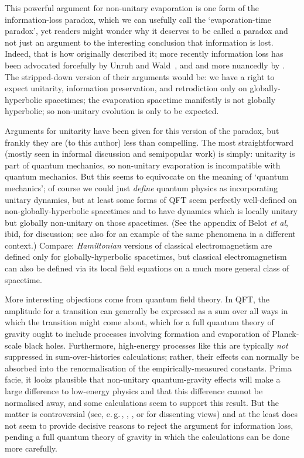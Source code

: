 \documentclass[12pt]{article}
\newcommand{\egc}{\mbox{e.\,g.\,}}
\begin{document}
This powerful argument for non-unitary evaporation is one form of the information-loss paradox, which we can usefully call the `evaporation-time paradox', yet readers might wonder why it deserves to be called a paradox and not just an argument to the interesting conclusion that information is lost. Indeed, that is how  originally described it; more recently information loss has been advocated forcefully by Unruh and Wald~\citeyear{unruhwaldpuremixed,unruhwaldinformation},  and  and more nuancedly by . The stripped-down version of their arguments would be: we have a right to expect unitarity, information preservation, and retrodiction only on globally-hyperbolic spacetimes; the evaporation spacetime manifestly is not globally hyperbolic; so non-unitary evolution is only to be expected.

Arguments for unitarity have been given for this version of the paradox, but frankly they are (to this author) less than compelling. The most straightforward (mostly seen in informal discussion and semipopular work) is simply: unitarity is part of quantum mechanics, so non-unitary evaporation is incompatible with quantum mechanics. But this seems to equivocate on the meaning of `quantum mechanics'; of course we could just \emph{define} quantum physics as incorporating unitary dynamics, but at least some forms of QFT seem perfectly well-defined on non-globally-hyperbolic spacetimes and to have dynamics which is locally unitary but globally non-unitary on those spacetimes. (See the appendix of Belot \emph{et al}, ibid, for discussion; see also  for an example of the same phenomena in a different context.) Compare: \emph{Hamiltonian} versions of classical electromagnetism are defined only for globally-hyperbolic spacetimes, but classical electromagnetism can also be defined via its local field equations on a much more general class of spacetime. 

More interesting objections come from quantum field theory. In QFT, the amplitude for a transition can generally be expressed as  a sum over all ways in which the transition might come about, which for a full quantum theory of gravity ought to include processes involving formation and evaporation of Planck-scale black holes. Furthermore, high-energy processes like this are typically \emph{not} suppressed in sum-over-histories calculations; rather, their effects can normally be absorbed into the renormalisation of the empirically-measured constants. Prima facie, it looks plausible that non-unitary quantum-gravity effects will make a large difference to low-energy physics and that this difference cannot be normalised away, and some calculations \cite{bankspeskinsusskind,srednickipurity} seem to support this result. But the matter is controversial (see, \egc, , , or  for dissenting views) and at the least does not seem to provide decisive reasons to reject the argument for information loss, pending a full quantum theory of gravity in which the calculations can be done more carefully.
\end{document}
